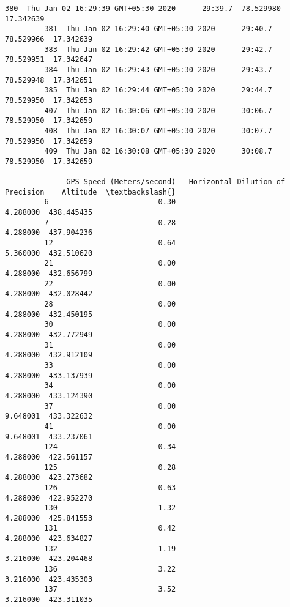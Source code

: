 \documentclass[11pt]{article}
\begin{document}
\begin{Verbatim}[commandchars=\\\{\}]
         380  Thu Jan 02 16:29:39 GMT+05:30 2020      29:39.7  78.529980  17.342639   
         381  Thu Jan 02 16:29:40 GMT+05:30 2020      29:40.7  78.529966  17.342639   
         383  Thu Jan 02 16:29:42 GMT+05:30 2020      29:42.7  78.529951  17.342647   
         384  Thu Jan 02 16:29:43 GMT+05:30 2020      29:43.7  78.529948  17.342651   
         385  Thu Jan 02 16:29:44 GMT+05:30 2020      29:44.7  78.529950  17.342653   
         407  Thu Jan 02 16:30:06 GMT+05:30 2020      30:06.7  78.529950  17.342659   
         408  Thu Jan 02 16:30:07 GMT+05:30 2020      30:07.7  78.529950  17.342659   
         409  Thu Jan 02 16:30:08 GMT+05:30 2020      30:08.7  78.529950  17.342659   
         
              GPS Speed (Meters/second)   Horizontal Dilution of Precision    Altitude  \textbackslash{}
         6                         0.30                           4.288000  438.445435   
         7                         0.28                           4.288000  437.904236   
         12                        0.64                           5.360000  432.510620   
         21                        0.00                           4.288000  432.656799   
         22                        0.00                           4.288000  432.028442   
         28                        0.00                           4.288000  432.450195   
         30                        0.00                           4.288000  432.772949   
         31                        0.00                           4.288000  432.912109   
         33                        0.00                           4.288000  433.137939   
         34                        0.00                           4.288000  433.124390   
         37                        0.00                           9.648001  433.322632   
         41                        0.00                           9.648001  433.237061   
         124                       0.34                           4.288000  422.561157   
         125                       0.28                           4.288000  423.273682   
         126                       0.63                           4.288000  422.952270   
         130                       1.32                           4.288000  425.841553   
         131                       0.42                           4.288000  423.634827   
         132                       1.19                           3.216000  423.204468   
         136                       3.22                           3.216000  423.435303   
         137                       3.52                           3.216000  423.311035   

\end{Verbatim}
\end{document}
